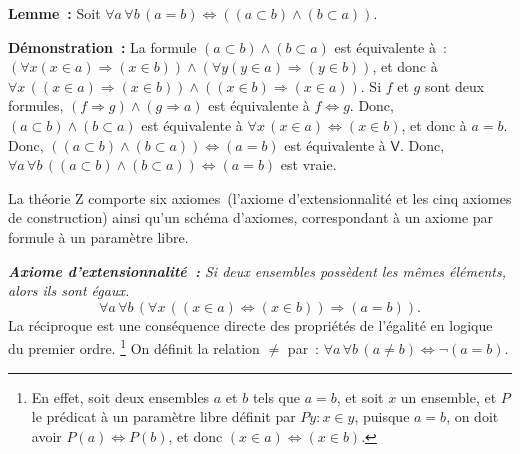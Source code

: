 \medskip

\noindent\textbf{Lemme :} Soit $\forall a \, \forall b \, (a = b) \Leftrightarrow ((a \subset b) \wedge (b \subset a))$.

\medskip

\noindent\textbf{Démonstration :} 
    La formule $(a \subset b) \wedge (b \subset a)$ est équivalente à : $(\forall x (x \in a) \Rightarrow (x \in b)) \wedge (\forall y (y \in a) \Rightarrow (y \in b))$, et donc à $\forall x \, ((x \in a) \Rightarrow (x \in b)) \wedge ((x \in b) \Rightarrow (x \in a))$.
    Si $f$ et $g$ sont deux formules, $(f \Rightarrow g) \wedge (g \Rightarrow a)$ est équivalente à $f \Leftrightarrow g$.
    Donc, $(a \subset b) \wedge (b \subset a)$ est équivalente à $\forall x \, (x \in a) \Leftrightarrow (x \in b)$, et donc à $a = b$.
    Donc, $((a \subset b) \wedge (b \subset a)) \Leftrightarrow (a = b)$ est équivalente à $\mathsf{V}$.
    Donc, $\forall a \, \forall b \, ((a \subset b) \wedge (b \subset a)) \Leftrightarrow (a = b)$ est vraie.

    \done

\medskip

La théorie Z comporte six axiomes (l'axiome d'extensionnalité et les cinq axiomes de construction) ainsi qu'un schéma d'axiomes, correspondant à un axiome par formule à un paramètre libre. 

\medskip

\noindent\textit{\textbf{Axiome d'extensionnalité :} Si deux ensembles possèdent les mêmes éléments, alors ils sont égaux.}
\begin{equation*}
    \forall a \, \forall b \, (
        \forall x \, ((x \in a) \Leftrightarrow (x \in b)) \Rightarrow (a = b)
    ). 
\end{equation*}
La réciproque est une conséquence directe des propriétés de l'égalité en logique du premier ordre.%
\footnote{ En effet, soit deux ensembles $a$ et $b$ tels que $a = b$, et soit $x$ un ensemble, et $P$ le prédicat à un paramètre libre définit par $P y: x \in y$, puisque $a = b$, on doit avoir $P(a) \Leftrightarrow P(b)$, et donc $(x \in a) \Leftrightarrow (x \in b)$.}
On définit la relation $\neq$ par : $\forall a \, \forall b \, (a \neq b) \Leftrightarrow \neg (a = b)$.

\medskip

